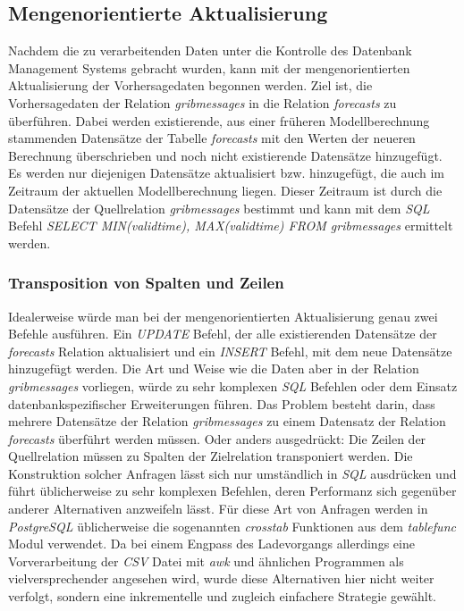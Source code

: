 \subsection{Mengenorientierte Aktualisierung}
Nachdem die zu verarbeitenden Daten unter die Kontrolle des Datenbank
Management Systems gebracht wurden, kann mit der mengenorientierten
Aktualisierung der Vorhersagedaten begonnen werden. Ziel ist, die
Vorhersagedaten der Relation \textit{grib\textunderscore messages} in
die Relation \textit{forecasts} zu überführen. Dabei werden
existierende, aus einer früheren Modellberechnung stammenden
Datensätze der Tabelle \textit{forecasts} mit den Werten der neueren
Berechnung überschrieben und noch nicht existierende Datensätze
hinzugefügt. Es werden nur diejenigen Datensätze aktualisiert bzw.
hinzugefügt, die auch im Zeitraum der aktuellen Modellberechnung
liegen. Dieser Zeitraum ist durch die Datensätze der Quellrelation
\textit{grib\textunderscore messages} bestimmt und kann mit dem
\textit{SQL} Befehl \textit{SELECT MIN(valid\textunderscore time),
  MAX(valid\textunderscore time) FROM grib\textunderscore messages}
ermittelt werden.

\subsubsection{Transposition von Spalten und Zeilen}
Idealerweise würde man bei der mengenorientierten Aktualisierung genau
zwei Befehle ausführen. Ein \textit{UPDATE} Befehl, der alle
existierenden Datensätze der \textit{forecasts} Relation aktualisiert
und ein \textit{INSERT} Befehl, mit dem neue Datensätze hinzugefügt
werden. Die Art und Weise wie die Daten aber in der Relation
\textit{grib\textunderscore messages} vorliegen, würde zu sehr
komplexen \textit{SQL} Befehlen oder dem Einsatz datenbankspezifischer
Erweiterungen führen. Das Problem besteht darin, dass mehrere
Datensätze der Relation \textit{grib\textunderscore messages} zu einem
Datensatz der Relation \textit{forecasts} überführt werden
müssen. Oder anders ausgedrückt: Die Zeilen der Quellrelation müssen
zu Spalten der Zielrelation transponiert werden. Die Konstruktion
solcher Anfragen lässt sich nur umständlich in \textit{SQL} ausdrücken
und führt üblicherweise zu sehr komplexen Befehlen, deren Performanz
sich gegenüber anderer Alternativen anzweifeln lässt. Für diese Art
von Anfragen werden in \textit{PostgreSQL} üblicherweise die
sogenannten \textit{crosstab} Funktionen aus dem \textit{tablefunc}
Modul verwendet. Da bei einem Engpass des Ladevorgangs allerdings eine
Vorverarbeitung der \textit{CSV} Datei mit \textit{awk} und ähnlichen
Programmen als vielversprechender angesehen wird, wurde diese
Alternativen hier nicht weiter verfolgt, sondern eine inkrementelle
und zugleich einfachere Strategie gewählt.

